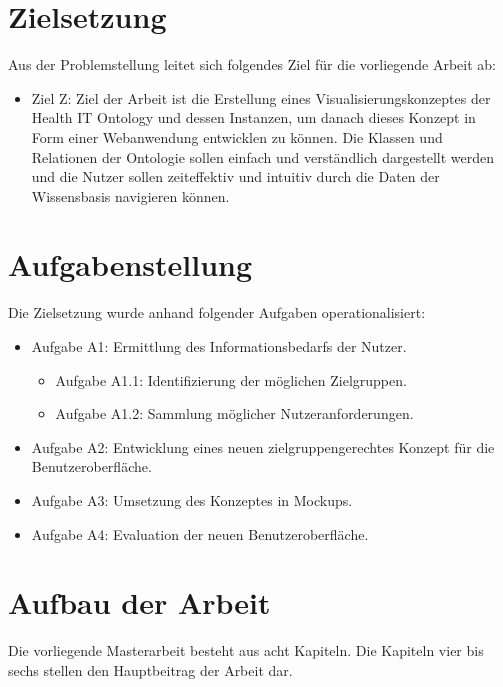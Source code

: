 \clearpage

\section{Zielsetzung}\label{sec:zielsetzung}

Aus der Problemstellung leitet sich folgendes Ziel für die vorliegende Arbeit ab:

\begin{itemize}
\item Ziel Z: Ziel der Arbeit ist die Erstellung eines Visualisierungskonzeptes der Health IT Ontology und dessen Instanzen, um danach dieses Konzept in Form einer Webanwendung entwicklen zu können.
Die Klassen und Relationen der Ontologie sollen einfach und verständlich dargestellt werden und die Nutzer sollen zeiteffektiv und intuitiv durch die Daten der Wissensbasis navigieren können.
\end{itemize}

\section{Aufgabenstellung}\label{sec:aufgabenstellung}

Die Zielsetzung wurde anhand folgender Aufgaben operationalisiert:

\begin{itemize}
	\item Aufgabe A1: Ermittlung des Informationsbedarfs der Nutzer.
		\begin{itemize}
		\item Aufgabe A1.1: Identifizierung der möglichen Zielgruppen.
		\item Aufgabe A1.2: Sammlung möglicher Nutzeranforderungen.
		\end{itemize}
	\item Aufgabe A2: Entwicklung eines neuen zielgruppengerechtes Konzept für die Benutzeroberfläche.
	\item Aufgabe A3: Umsetzung des Konzeptes in Mockups.
	\item Aufgabe A4: Evaluation der neuen Benutzeroberfläche.
\end{itemize}

\section{Aufbau der Arbeit}\label{sec:aufbau}

Die vorliegende Masterarbeit besteht aus acht Kapiteln. Die Kapiteln vier bis sechs stellen den Hauptbeitrag der Arbeit dar. \newline

